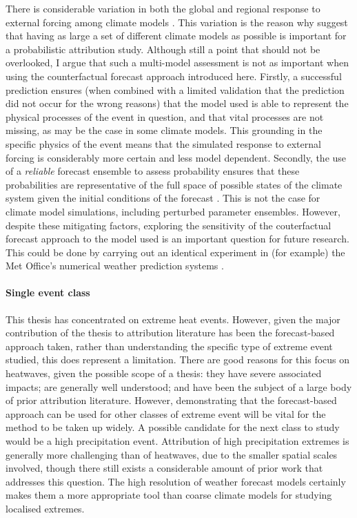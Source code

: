     There is considerable variation in both the global and regional response to external forcing among climate models \cite{meehl_context_2020,seneviratne_regional_2020,masson-delmotte_human_2021,masson-delmotte_earths_2021,masson-delmotte_linking_2021,masson-delmotte_weather_2021}. This variation is the reason why \citet{philip_protocol_2020} suggest that having as large a set of different climate models as possible is important for a probabilistic attribution study. Although still a point that should not be overlooked, I argue that such a multi-model assessment is not as important when using the counterfactual forecast approach introduced here. Firstly, a successful prediction ensures (when combined with a limited validation that the prediction did not occur for the wrong reasons) that the model used is able to represent the physical processes of the event in question, and that vital processes are not missing, as may be the case in some climate models. This grounding in the specific physics of the event means that the simulated response to external forcing is considerably more certain and less model dependent. Secondly, the use of a \emph{reliable} forecast ensemble to assess probability ensures that these probabilities are representative of the full space of possible states of the climate system given the initial conditions of the forecast \citep{murphy_new_1973}. This is not the case for climate model simulations, including perturbed parameter ensembles. However, despite these mitigating factors, exploring the sensitivity of the couterfactual forecast approach to the model used is an important question for future research. This could be done by carrying out an identical experiment in (for example) the Met Office's numerical weather prediction systems \citep{walters_met_2017,maclachlan_global_2015}.

  \paragraph*{Single event class}

    This thesis has concentrated on extreme heat events. However, given the major contribution of the thesis to attribution literature has been the forecast-based approach taken, rather than understanding the specific type of extreme event studied, this does represent a limitation. There are good reasons for this focus on heatwaves, given the possible scope of a thesis: they have severe associated impacts; are generally well understood; and have been the subject of a large body of prior attribution literature. However, demonstrating that the forecast-based approach can be used for other classes of extreme event will be vital for the method to be taken up widely. A possible candidate for the next class to study would be a high precipitation event. Attribution of high precipitation extremes is generally more challenging than of heatwaves, due to the smaller spatial scales involved, though there still exists a considerable amount of prior work that addresses this question. The high resolution of weather forecast models certainly makes them a more appropriate tool than coarse climate models for studying localised extremes.

